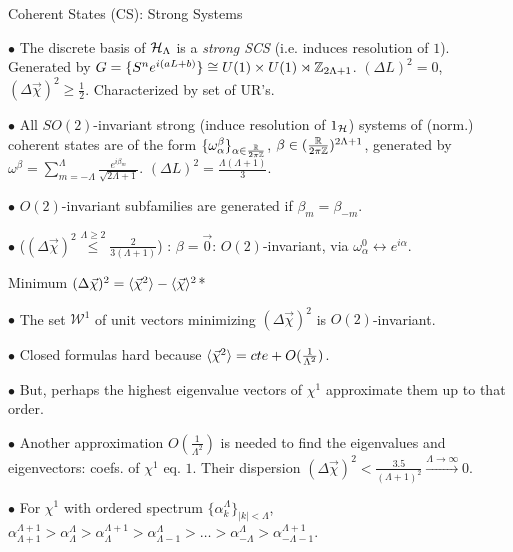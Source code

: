 \begin{frame}{Coherent States (CS): Strong Systems} %

    $\bullet$ The discrete basis of $\mathcal H_\Lambda$ is a \textit{strong SCS} (i.e. induces resolution of $1$). Generated by $G = \{S^n e^{i(aL + b)}\}\cong U(1)\times U(1) \rtimes \mathbb Z_{2\Lambda + 1}$. $(\Delta L)^2 = 0$, $(\Delta \vec \chi)^2 \geq \frac{1}{2}$. Characterized by set of UR's.
    
    $\bullet$ All $SO(2)$-invariant strong (induce resolution of $1_\mathcal H$) systems of (norm.) coherent states are of the form $\{\omega^\beta_\alpha\}_{\alpha \in \frac{\mathbb R}{2\pi\mathbb Z}}$, $\beta \in (\frac{\mathbb R}{2\pi\mathbb Z})^{2\Lambda+1}$, generated by $\omega^\beta = \sum_{m = -\Lambda}^\Lambda \frac{e^{i\beta_m}}{\sqrt{2\Lambda+1}}$. $(\Delta L)^2 = \frac{\Lambda(\Lambda + 1)}{3}$.
    
    $\bullet$ $O(2)$-invariant subfamilies are generated if $\beta_m = \beta_{-m}$. 
    
    $\bullet$  ($(\Delta \vec \chi)^2 \overset{\Lambda \geq 2}{\leq } \frac{2}{3(\Lambda + 1)}$) :  $\beta = \vec 0$: $O(2)$-invariant,  via $\omega^0_\alpha \leftrightarrow e^{i \alpha}$.
\end{frame}

\begin{frame}{Minimum $(\Delta \vec \chi)^2 = \langle \vec \chi^2 \rangle - \langle \vec \chi \rangle ^2$*} %

    $\bullet$ The set $\mathcal W^1$ of unit vectors minimizing $(\Delta \vec \chi)^2$ is $O(2)$-invariant.
    
    $\bullet$ Closed formulas hard because $\langle \vec \chi ^2 \rangle = cte + O(\frac{1}{\Lambda^2})$.
    
    $\bullet$ But, perhaps the highest eigenvalue vectors of $\chi^1$ approximate them up to that order.
    
    $\bullet$ Another approximation $O(\frac{1}{\Lambda^2})$ is needed to find the eigenvalues and eigenvectors: coefs. of $\chi^1$ eq. $1$. Their dispersion $(\Delta \vec \chi)^2 < \frac{3.5}{(\Lambda+1)^2} \overset{\Lambda \to \infty}{\longrightarrow} 0$.
    
    $\bullet$ For $\chi^1$ with ordered spectrum $\{\alpha^\Lambda_k\}_{|k|<\Lambda}$, 
    $\alpha_{\Lambda+1}^{\Lambda+1} > \alpha_{\Lambda}^{\Lambda} > \alpha_\Lambda^{\Lambda+1} > \alpha_{\Lambda-1}^{\Lambda} > \dots > \alpha_{-\Lambda}^{\Lambda} > \alpha_{-\Lambda-1}^{\Lambda+1}$.
    
\end{frame}